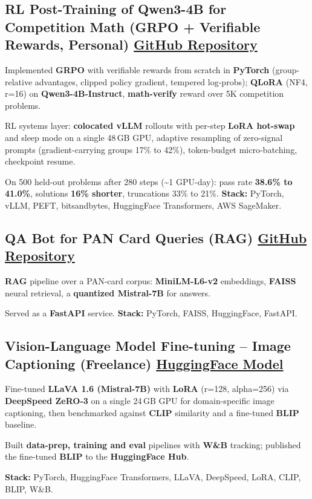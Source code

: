 \documentclass[letter,10pt]{article}
\begin{document}
\subsection{RL Post-Training of Qwen3-4B for Competition Math (GRPO + Verifiable Rewards, Personal) \hfill \href{https://github.com/sunil448832/preference-alignment-grpo}{GitHub Repository}}
\begin{zitemize}
\item Implemented \textbf{GRPO} with verifiable rewards from scratch in \textbf{PyTorch} (group-relative advantages, clipped policy gradient, tempered log-probs); \textbf{QLoRA} (NF4, r=16) on \textbf{Qwen3-4B-Instruct}, \textbf{math-verify} reward over 5K competition problems.
\item RL systems layer: \textbf{colocated vLLM} rollouts with per-step \textbf{LoRA hot-swap} and sleep mode on a single 48\,GB GPU, adaptive resampling of zero-signal prompts (gradient-carrying groups 17\% to 42\%), token-budget micro-batching, checkpoint resume.
\item On 500 held-out problems after 280 steps (\textasciitilde1 GPU-day): pass rate \textbf{38.6\% to 41.0\%}, solutions \textbf{16\% shorter}, truncations 33\% to 21\%. \textbf{Stack:} PyTorch, vLLM, PEFT, bitsandbytes, HuggingFace Transformers, AWS SageMaker.
\end{zitemize}

\subsection{QA Bot for PAN Card Queries (RAG) \hfill \href{https://github.com/sunil448832/Natural-Language-Processing/tree/master/RAG(Retrieval\%20Augment\%20Generation)}{GitHub Repository}}
\begin{zitemize}
\item \textbf{RAG} pipeline over a PAN-card corpus: \textbf{MiniLM-L6-v2} embeddings, \textbf{FAISS} neural retrieval, a \textbf{quantized Mistral-7B} for answers.
\item Served as a \textbf{FastAPI} service. \textbf{Stack:} PyTorch, FAISS, HuggingFace, FastAPI.
\end{zitemize}

\subsection{Vision-Language Model Fine-tuning – Image Captioning (Freelance) \hfill \href{https://huggingface.co/sunil448832/blip-model}{HuggingFace Model}}
\begin{zitemize}
\item Fine-tuned \textbf{LLaVA 1.6 (Mistral-7B)} with \textbf{LoRA} (r=128, alpha=256) via \textbf{DeepSpeed ZeRO-3} on a single 24\,GB GPU for domain-specific image captioning, then benchmarked against \textbf{CLIP} similarity and a fine-tuned \textbf{BLIP} baseline.
\item Built \textbf{data-prep, training and eval} pipelines with \textbf{W\&B} tracking; published the fine-tuned \textbf{BLIP} to the \textbf{HuggingFace Hub}.
\item \textbf{Stack:} PyTorch, HuggingFace Transformers, LLaVA, DeepSpeed, LoRA, CLIP, BLIP, W\&B.
\end{zitemize}
\end{document}
